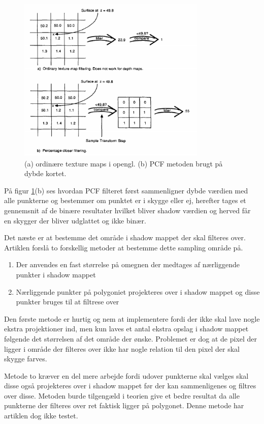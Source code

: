 \documentclass[11pt,a4paper]{article}
\begin{document}
\begin{figure}[ht!]
\centering
\includegraphics[width=90mm]{img/PCF1.png}
\caption{(a) ordinære texture maps i opengl. (b) PCF metoden brugt på dybde kortet.}
\label{P4}
\end{figure}


På figur \ref{P4}(b) ses hvordan PCF filteret først sammenligner dybde værdien med alle punkterne og bestemmer om punktet er i skygge eller ej, herefter tages et gennemsnit af de binære resultater hvilket bliver shadow værdien og herved får en skygger der bliver udglattet og ikke binær.


Det næste er at bestemme det område i shadow mappet der skal filteres over. Artiklen \cite{PCF} forslå to forskellig metoder at bestemme dette sampling område på.

\begin{enumerate}
\item Der anvendes en fast størrelse på omegnen der medtages af nærliggende punkter i shadow mappet
\item Nærliggende punkter på polygoniet projekteres over i shadow mappet og disse punkter bruges til at filtrese over
\end{enumerate}

Den første metode er hurtig og nem at implementere fordi der ikke skal lave nogle ekstra projektioner ind, men kun laves et antal ekstra opslag i shadow mappet følgende det størrelsen af det område der ønske. Problemet er dog at de pixel der ligger i område der filteres over ikke har nogle relation til den pixel der skal skygge farves.

Metode to kræver en del mere arbejde fordi udover punkterne skal vælges skal disse også projekteres over i shadow mappet før der kan sammenligenes og filtres over disse. Metoden burde tilgengæld i teorien give et bedre resultat da alle punkterne der filteres over ret faktisk ligger på polygonet. Denne metode har artiklen  \cite{PCF} dog ikke testet.
\end{document}
